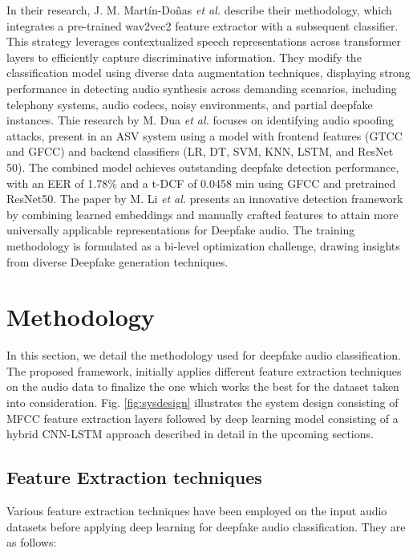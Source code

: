 \documentclass[conference]{IEEEtran}
\begin{document}
In their research, J. M. Martín-Doñas \textit{et al.} \cite{b13} describe their methodology, which integrates a pre-trained wav2vec2 feature extractor with a subsequent classifier. This strategy leverages contextualized speech representations across transformer layers to efficiently capture discriminative information. They modify the classification model using diverse data augmentation techniques, displaying strong performance in detecting audio synthesis across demanding scenarios, including telephony systems, audio codecs, noisy environments, and partial deepfake instances.
Thie research by M. Dua \textit{et al.} \cite{b14} focuses on identifying audio spoofing attacks, present in an ASV system using a model with frontend features (GTCC and GFCC) and backend classifiers (LR, DT, SVM, KNN, LSTM, and ResNet 50). The combined model achieves outstanding deepfake detection performance, with an EER of 1.78\% and a t-DCF of 0.0458 min using GFCC and pretrained ResNet50.
The paper \cite{b15} by M. Li \textit{et al.} presents an innovative detection framework by combining learned embeddings and manually crafted features to attain more universally applicable representations for Deepfake audio. The training methodology is formulated as a bi-level optimization challenge, drawing insights from diverse Deepfake generation techniques.




\section{Methodology}
In this section, we detail the methodology used for deepfake audio classification. The proposed framework, initially applies different feature extraction techniques on the audio data to finalize the one which works the best for the dataset taken into consideration. Fig. \ref{fig:sysdesign} illustrates the system design consisting of MFCC feature extraction layers followed by deep learning model consisting of a hybrid CNN-LSTM approach described in detail in the upcoming sections.

\subsection{Feature Extraction techniques}\label{AA}

Various feature extraction techniques have been employed on the input audio datasets before applying deep learning for deepfake audio classification. They are as follows:
\end{document}
